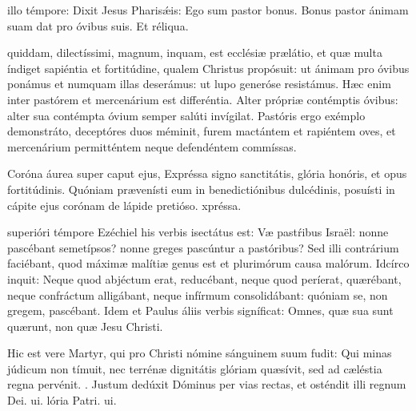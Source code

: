 \documentclass[fontsize=9pt,paper=A6,twoside,BCOR=1mm,DIV=22,headinclude]{scrarticle}
\begin{document}
\begin{multicols}{2}
 illo témpore: Dixit Jesus Pharis\'æis: Ego sum pastor bonus. Bonus pastor ánimam suam dat pro óvibus suis. Et réliqua.


 quiddam, dilectíssimi, magnum, inquam, est ecclésiæ prælátio, et quæ multa índiget sapiéntia et fortitúdine, qualem Christus propósuit: ut ánimam pro óvibus ponámus et numquam illas deserámus: ut lupo generóse resistámus. Hæc enim inter pastórem et mercenárium est differéntia. Alter própriæ contémptis óvibus: alter sua contémpta óvium semper salúti invígilat. Pastóris ergo exémplo demonstráto, deceptóres duos méminit, furem mactántem et rapiéntem oves, et mercenárium permitténtem neque defendéntem commíssas.

\R Coróna áurea super caput ejus,
\red{*} Expréssa signo sanctitátis, glória honóris, et opus fortitúdinis.
\V Quóniam prævenísti eum in benedictiónibus dulcédinis, posuísti in cápite ejus corónam de lápide pretióso.
xpréssa.

{
 superióri témpore Ezéchiel his verbis isectátus est: Væ pastŕibus Israël: nonne pascébant semetípsos? nonne greges pascúntur a pastóribus? Sed illi contrárium faciébant, quod máximæ malítiæ genus est et plurimórum causa malórum. Idcírco inquit: Neque quod abjéctum erat, reducébant, neque quod períerat, quærébant, neque confráctum alligábant, neque infírmum consolidábant: quóniam se, non gregem, pascébant. Idem et Paulus áliis verbis signíficat: Omnes, quæ sua sunt quærunt, non quæ Jesu Christi.

\R Hic est vere Martyr, qui pro Christi nómine sánguinem suum fudit:
\red{*} Qui minas júdicum non tímuit, nec terrénæ dignitátis glóriam quæsívit, sed ad cæléstia regna pervénit.
\V. Justum dedúxit Dóminus per vias rectas, et osténdit illi regnum Dei.
ui.
lória Patri.
ui.


}
\end{multicols}
\end{document}
